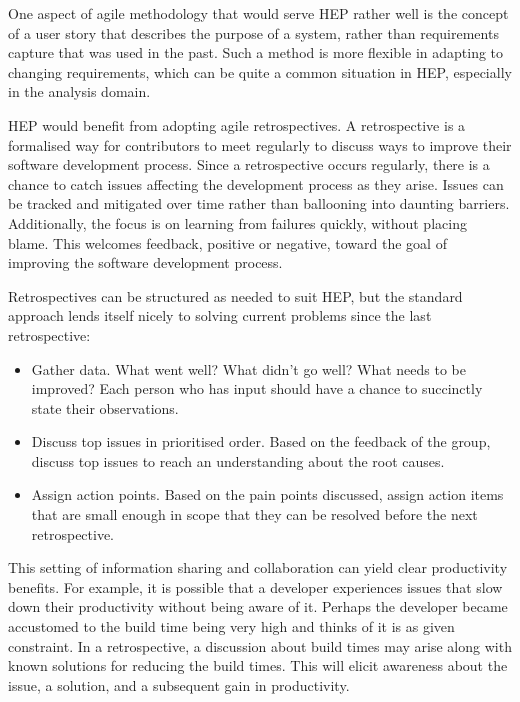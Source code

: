 \documentclass[12pt,a4paper]{article}
\begin{document}
One aspect of agile methodology that would serve HEP rather well is the
concept of a user story that describes the purpose of a system, rather
than requirements capture that was used in the past. Such a method is
more flexible in adapting to changing requirements, which can be quite a
common situation in HEP, especially in the analysis domain.

HEP would benefit from adopting agile retrospectives. A retrospective is
a formalised way for contributors to meet regularly to discuss ways to
improve their software development process. Since a retrospective occurs
regularly, there is a chance to catch issues affecting the development
process as they arise. Issues can be tracked and mitigated over time
rather than ballooning into daunting barriers. Additionally, the focus
is on learning from failures quickly, without placing blame. This
welcomes feedback, positive or negative, toward the goal of improving
the software development process.

Retrospectives can be structured as needed to suit HEP, but the standard
approach lends itself nicely to solving current problems since the last
retrospective:

\begin{itemize}
\item
    Gather data. What went well? What didn't go well? What needs to be
  improved? Each person who has input should have a chance to succinctly
  state their observations.
  \item
    Discuss top issues in prioritised order. Based on the feedback of the
  group, discuss top issues to reach an understanding about the root
  causes.
  \item
    Assign action points. Based on the pain points discussed, assign
  action items that are small enough in scope that they can be resolved
  before the next retrospective.
\end{itemize}

This setting of information sharing and collaboration can yield clear
productivity benefits. For example, it is possible that a developer
experiences issues that slow down their productivity without being aware
of it. Perhaps the developer became accustomed to the build time being
very high and thinks of it is as given constraint. In a retrospective, a
discussion about build times may arise along with known solutions for
reducing the build times. This will elicit awareness about the issue, a
solution, and a subsequent gain in productivity.
\end{document}
